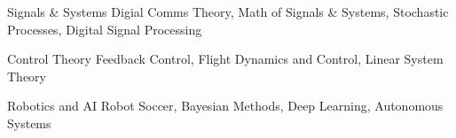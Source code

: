 

\begin{cvskills}

  \cvskill
    {Signals \& Systems} %
    {Digial Comms Theory, Math of Signals \& Systems, Stochastic Processes, Digital Signal Processing} %

  \cvskill
    {Control Theory} %
    {Feedback Control, Flight Dynamics and Control, Linear System Theory} %

  \cvskill
    {Robotics and AI} %
    {Robot Soccer, Bayesian Methods, Deep Learning, Autonomous Systems} %

\end{cvskills}
